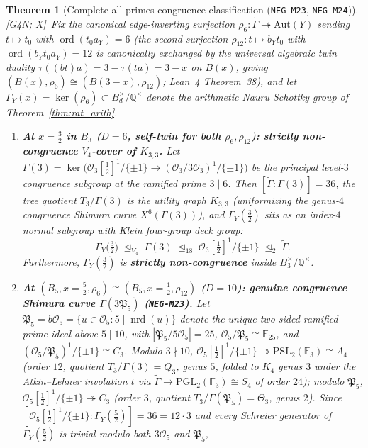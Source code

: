 \documentclass[11pt]{amsart}
\numberwithin{equation}{section}
\theoremstyle{plain}
\newtheorem{theorem}{Theorem}[section]
\theoremstyle{definition}\newtheorem{definition}[theorem]{Definition}
\theoremstyle{remark}\newtheorem{remark}[theorem]{Remark}
\newcommand{\Q}{\mathbb{Q}}
\newcommand{\F}{\mathbb{F}}
\newcommand{\calO}{\mathcal{O}}
\newcommand{\PGL}{\mathrm{PGL}}
\newcommand{\PSL}{\mathrm{PSL}}
\newcommand{\Aut}{\mathrm{Aut}}
\newcommand{\nrd}{\operatorname{nrd}}
\newcommand{\ctag}[1]{\textup{\textsf{\scriptsize[#1]}}}
\begin{document}
\begin{theorem}[Complete all-primes congruence classification (\texttt{NEG-M23}, \texttt{NEG-M24})]\label{thm:noncongruence}
\ctag{G4N; X}\ Fix the canonical edge-inverting surjection $\rho_6:\tilde{\Gamma}\twoheadrightarrow\Aut(Y)$ sending $t\mapsto t_0$ with $\operatorname{ord}(t_0 a_Y)=6$ (the second surjection $\rho_{12}:t\mapsto b_Y t_0$ with $\operatorname{ord}(b_Y t_0 a_Y)=12$ is canonically exchanged by the universal algebraic twin duality $\tau((bt)a)=3-\tau(ta)=3-x$ on $B(x)$, giving $(B(x),\rho_6)\cong(B(3-x),\rho_{12})$; Lean~4 Theorem~38), and let $\Gamma_Y(x)=\ker(\rho_6)\subset B_d^\times/\Q^\times$ denote the arithmetic Nauru Schottky group of Theorem~\ref{thm:rat_arith}.
\begin{enumerate}[label=(\alph*),nosep]
\item \textbf{At $x=\tfrac32$ in $B_3$ ($D=6$, self-twin for both $\rho_6,\rho_{12}$): strictly non-congruence $V_4$-cover of $K_{3,3}$.} Let $\Gamma(3)=\ker\bigl(\calO_3[\tfrac12]^1/\{\pm 1\}\to (\calO_3/3\calO_3)^1/\{\pm 1\}\bigr)$ be the principal level-$3$ congruence subgroup at the ramified prime $3\mid 6$. Then $[\tilde{\Gamma}:\Gamma(3)]=36$, the tree quotient $T_3/\Gamma(3)$ is the utility graph $K_{3,3}$ (uniformizing the genus-$4$ congruence Shimura curve $X^6(\Gamma(3))$), and $\Gamma_Y(\frac32)$ sits as an index-$4$ normal subgroup with Klein four-group deck group:
\begin{equation}\label{eq:tower_b3}
\Gamma_Y\bigl(\tfrac32\bigr) \;\trianglelefteq_{V_4}\; \Gamma(3) \;\trianglelefteq_{18}\; \calO_3[\tfrac12]^1/\{\pm 1\} \;\trianglelefteq_2\; \tilde{\Gamma}.
\end{equation}
Furthermore, $\Gamma_Y(\frac32)$ is \textbf{strictly non-congruence} inside $B_3^\times/\Q^\times$.
\item \textbf{At $(B_5, x=\tfrac52, \rho_6) \cong (B_5, x=\tfrac12, \rho_{12})$ ($D=10$): genuine congruence Shimura curve $\Gamma(3\mathfrak{P}_5)$ (\textup{\texttt{NEG-M23}}).} Let $\mathfrak{P}_5=b\calO_5=\{u\in\calO_5 : 5\mid\nrd(u)\}$ denote the unique two-sided ramified prime ideal above $5\mid 10$, with $|\mathfrak{P}_5/5\calO_5|=25$, $\calO_5/\mathfrak{P}_5\cong\F_{25}$, and $(\calO_5/\mathfrak{P}_5)^1/\{\pm 1\}\cong C_3$. Modulo $3\nmid 10$, $\calO_5[\tfrac12]^1/\{\pm 1\}\twoheadrightarrow\PSL_2(\F_3)\cong A_4$ (order $12$, quotient $T_3/\Gamma(3)=Q_3$, genus $5$, folded to $K_4$ genus $3$ under the Atkin--Lehner involution $t$ via $\tilde{\Gamma}\to\PGL_2(\F_3)\cong S_4$ of order $24$); modulo $\mathfrak{P}_5$, $\calO_5[\tfrac12]^1/\{\pm 1\}\twoheadrightarrow C_3$ (order $3$, quotient $T_3/\Gamma(\mathfrak{P}_5)=\Theta_3$, genus $2$). Since $[\calO_5[\tfrac12]^1/\{\pm 1\}:\Gamma_Y(\tfrac52)]=36=12\cdot 3$ and every Schreier generator of $\Gamma_Y(\tfrac52)$ is trivial modulo both $3\calO_5$ and $\mathfrak{P}_5$,

\end{enumerate}
\end{theorem}
\end{document}
